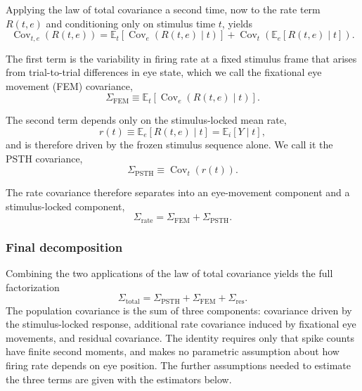 \documentclass{lite}
\newcommand{\E}{\mathbb{E}}
\renewcommand{\C}{\operatorname{Cov}}
\begin{document}
Applying the law of total covariance a second time, now to the rate term $R(t,e)$ and conditioning only on stimulus time $t$, yields
\begin{equation}
\C_{t,e}(R(t,e))
= \E_{t}\!\left[ \C_{e}(R(t,e) \mid t) \right]
+ \C_{t}\!\left( \E_{e}[R(t,e) \mid t] \right).
\end{equation}

The first term is the variability in firing rate at a fixed stimulus frame that arises from trial-to-trial differences in eye state, which we call the fixational eye movement (FEM) covariance,
\begin{equation}
\Sigma_{\text{FEM}} \equiv \E_{t}\!\left[ \C_{e}(R(t,e) \mid t) \right].
\end{equation}

The second term depends only on the stimulus-locked mean rate,
\begin{equation}
r(t) \equiv \E_{e}[R(t,e) \mid t] = \E_{i}[Y \mid t],
\end{equation}
and is therefore driven by the frozen stimulus sequence alone. We call it the PSTH covariance,
\begin{equation}
\Sigma_{\text{PSTH}} \equiv \C_{t}(r(t)).
\end{equation}

The rate covariance therefore separates into an eye-movement component and a stimulus-locked component,
\begin{equation}
\Sigma_{\text{rate}} = \Sigma_{\text{FEM}} + \Sigma_{\text{PSTH}}.
\end{equation}

\subsubsection{Final decomposition}

Combining the two applications of the law of total covariance yields the full factorization
\begin{equation}
\Sigma_{\text{total}} = \Sigma_{\text{PSTH}} + \Sigma_{\text{FEM}} + \Sigma_{\text{res}}.
\end{equation}
The population covariance is the sum of three components: covariance driven by the stimulus-locked response, additional rate covariance induced by fixational eye movements, and residual covariance. The identity requires only that spike counts have finite second moments, and makes no parametric assumption about how firing rate depends on eye position. The further assumptions needed to estimate the three terms are given with the estimators below.
\end{document}
